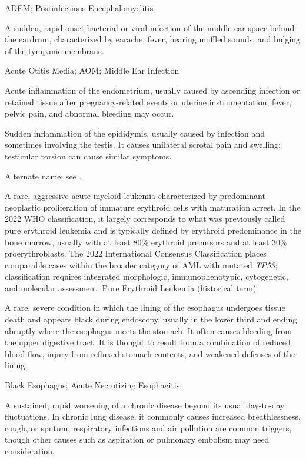 \synonyms
ADEM; Postinfectious Encephalomyelitis

 A sudden, rapid-onset bacterial or viral infection of the middle ear space behind the eardrum, characterized by earache, fever, hearing muffled sounds, and bulging of the tympanic membrane.

\synonyms
Acute Otitis Media; AOM; Middle Ear Infection

 Acute inflammation of the endometrium, usually caused by ascending infection or retained tissue after pregnancy-related events or uterine instrumentation; fever, pelvic pain, and abnormal bleeding may occur.

 Sudden inflammation of the epididymis, usually caused by infection and sometimes involving the testis. It causes unilateral scrotal pain and swelling; testicular torsion can cause similar symptoms.

 Alternate name; see .

 A rare, aggressive acute myeloid leukemia characterized by predominant neoplastic proliferation of immature erythroid cells with maturation arrest. In the 2022 WHO classification, it largely corresponds to what was previously called pure erythroid leukemia and is typically defined by erythroid predominance in the bone marrow,
usually with at least 80\% erythroid precursors and at least 30\% proerythroblasts.
The 2022 International Consensus Classification places comparable cases within the broader category of AML with mutated \textit{TP53};
classification requires integrated morphologic, immunophenotypic, cytogenetic, and molecular assessment.
\synonyms
Pure Erythroid Leukemia (historical term)

 A rare, severe condition in which the lining of the esophagus undergoes tissue death and appears black during endoscopy, usually in the lower third and ending abruptly where the esophagus meets the stomach. It often causes bleeding from the upper digestive tract. It is thought to result from a combination of reduced blood flow, injury from refluxed stomach contents, and weakened defenses of the lining.

\synonyms
Black Esophagus; Acute Necrotizing Esophagitis

 A sustained, rapid worsening of a chronic disease beyond its usual day-to-day fluctuations. In chronic lung disease, it commonly causes increased breathlessness, cough, or sputum; respiratory infections and air pollution are common triggers, though other causes such as aspiration or pulmonary embolism may need consideration.

